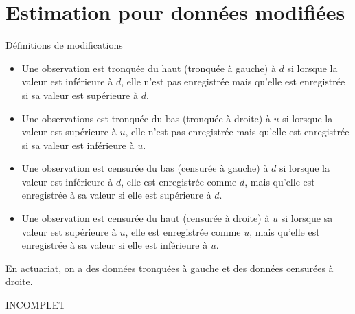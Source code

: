 \chapter{Estimation pour données modifiées}

\begin{definition}{Définitions de modifications}{}
	\begin{itemize}
		\item Une observation est tronquée du haut (tronquée à gauche) à $d$ si lorsque la valeur est inférieure à $d$, elle n'est pas enregistrée mais qu'elle est enregistrée si sa valeur est supérieure à $d$. 
		\item Une observations est tronquée du bas (tronquée à droite) à $u$ si lorsque la valeur est supérieure à $u$, elle n'est pas enregistrée mais qu'elle est enregistrée si sa valeur est inférieure à $u$. 
		\item Une observation est censurée du bas (censurée à gauche) à $d$ si lorsque la valeur est inférieure à $d$, elle est enregistrée comme $d$, mais qu'elle est enregistrée à sa valeur si elle est supérieure à $d$. 
		\item Une observation est censurée du haut (censurée à droite) à $u$ si lorsque sa valeur est supérieure à $u$, elle est enregistrée comme $u$, mais qu'elle est enregistrée à sa valeur si elle est inférieure à $u$. 
	\end{itemize}
\end{definition}

En actuariat, on a des données tronquées à gauche et des données censurées à droite. 

INCOMPLET